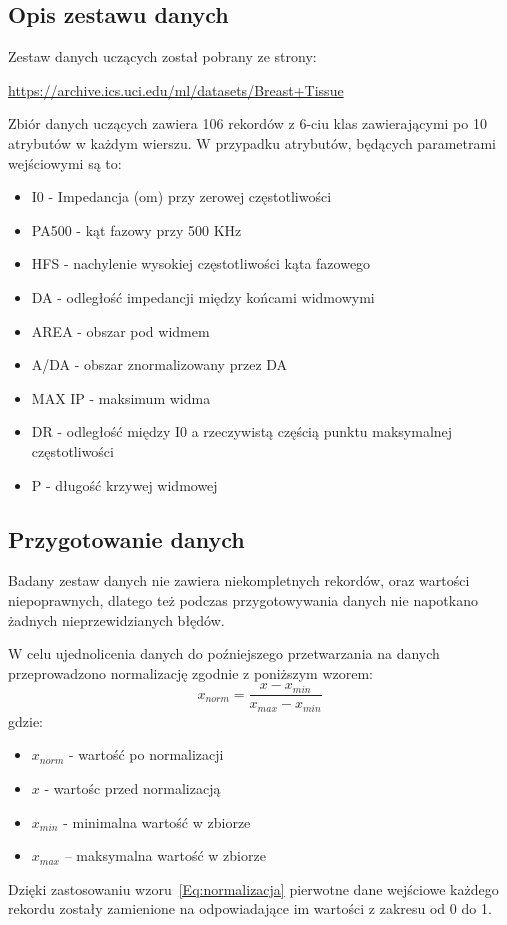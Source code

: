 \documentclass[12pt,twoside]{article}
\begin{document}
\subsection{Opis zestawu danych}
Zestaw danych uczących został pobrany ze strony:

\url{https://archive.ics.uci.edu/ml/datasets/Breast+Tissue}

Zbiór danych uczących zawiera 106 rekordów z 6-ciu klas zawierającymi po 10 atrybutów w każdym wierszu.
W przypadku atrybutów, będących parametrami wejściowymi są to:
\begin{itemize}
	\item I0 - Impedancja (om) przy zerowej częstotliwości
	\item PA500 - kąt fazowy przy 500 KHz
	\item HFS - nachylenie wysokiej częstotliwości kąta fazowego
	\item DA - odległość impedancji między końcami widmowymi
	\item AREA - obszar pod widmem
	\item A/DA - obszar znormalizowany przez DA
	\item MAX IP - maksimum widma
	\item DR - odległość między I0 a rzeczywistą częścią punktu maksymalnej częstotliwości
	\item P - długość krzywej widmowej
\end{itemize}
\newpage
\subsection{Przygotowanie danych}
Badany zestaw danych nie zawiera niekompletnych rekordów, oraz wartości niepoprawnych, dlatego też podczas przygotowywania danych nie napotkano żadnych nieprzewidzianych błędów.

W celu ujednolicenia danych do poźniejszego przetwarzania na danych przeprowadzono normalizację zgodnie z poniższym wzorem:
\begin{equation}
	x_{norm}=\frac{x-x_{min}}{x_{max}-x_{min}}
	\label{Eq:normalizacja}
\end{equation}
gdzie:
\begin{itemize}
	\setlength\itemsep{0em}
	\item $x_{norm}$ - wartość po normalizacji
	\item $x$ - wartośc przed normalizacją
	\item $x_{min}$ - minimalna wartość w zbiorze
	\item $x_{max}$ – maksymalna wartość w zbiorze
\end{itemize}
Dzięki zastosowaniu wzoru~\ref{Eq:normalizacja} pierwotne dane wejściowe każdego rekordu zostały zamienione na odpowiadające im wartości z zakresu od 0 do 1.
\newpage
\end{document}
